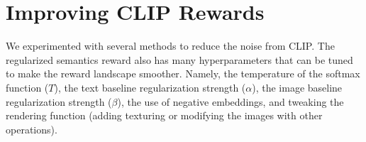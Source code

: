 







\section{Improving CLIP Rewards}
\label{sec:improving-rewards}

We experimented with several methods to reduce the noise from CLIP.
The regularized semantics reward also has many hyperparameters that can be tuned to make the reward landscape smoother.
Namely, the temperature of the softmax function (\(T\)), the text baseline regularization strength (\(\alpha\)), the image baseline regularization strength (\(\beta\)), the use of negative embeddings, and tweaking the rendering function (adding texturing or modifying the images with other operations).


